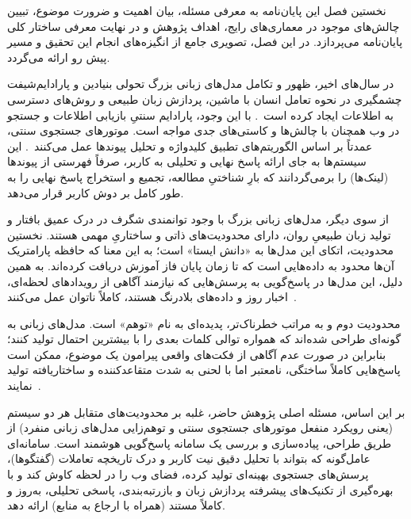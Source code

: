 
نخستین فصل این پایان‌نامه به معرفی مسئله، بیان اهمیت و ضرورت موضوع، تبیین چالش‌های موجود در معماری‌های رایج، اهداف پژوهش و در نهایت معرفی ساختار کلی پایان‌نامه می‌پردازد. در این فصل، تصویری جامع از انگیزه‌های انجام این تحقیق و مسیر پیش رو ارائه می‌گردد.


در سال‌های اخیر، ظهور و تکامل مدل‌های زبانی بزرگ تحولی بنیادین و پارادایم‌شیفت چشمگیری در نحوه تعامل انسان با ماشین، پردازش زبان طبیعی و روش‌های دسترسی به اطلاعات ایجاد کرده است~. با این وجود، پارادایم سنتیِ بازیابی اطلاعات و جستجو در وب همچنان با چالش‌ها و کاستی‌های جدی مواجه است. موتورهای جستجوی سنتی، عمدتاً بر اساس الگوریتم‌های تطبیق کلیدواژه و تحلیل پیوندها عمل می‌کنند~. این سیستم‌ها به جای ارائه پاسخ نهایی و تحلیلی به کاربر، صرفاً فهرستی از پیوندها (لینک‌ها) را برمی‌گردانند که بارِ شناختیِ مطالعه، تجمیع و استخراج پاسخ نهایی را به طور کامل بر دوش کاربر قرار می‌دهد.

از سوی دیگر، مدل‌های زبانی بزرگ با وجود توانمندی شگرف در درک عمیق بافتار و تولید زبان طبیعیِ روان، دارای محدودیت‌های ذاتی و ساختاریِ مهمی هستند. نخستین محدودیت، اتکای این مدل‌ها به «دانش ایستا» است؛ به این معنا که حافظه پارامتریک آن‌ها محدود به داده‌هایی است که تا زمان پایان فاز آموزش دریافت کرده‌اند. به همین دلیل، این مدل‌ها در پاسخ‌گویی به پرسش‌هایی که نیازمند آگاهی از رویدادهای لحظه‌ای، اخبار روز و داده‌های بلادرنگ هستند، کاملاً ناتوان عمل می‌کنند~. 

محدودیت دوم و به مراتب خطرناک‌تر، پدیده‌ای به نام «توهم» است. مدل‌های زبانی به گونه‌ای طراحی شده‌اند که همواره توالی کلمات بعدی را با بیشترین احتمال تولید کنند؛ بنابراین در صورت عدم آگاهی از فکت‌های واقعی پیرامون یک موضوع، ممکن است پاسخ‌هایی کاملاً ساختگی، نامعتبر اما با لحنی به شدت متقاعدکننده و ساختاریافته تولید نمایند~. 

بر این اساس، مسئله اصلی پژوهش حاضر، غلبه بر محدودیت‌های متقابل هر دو سیستم (یعنی رویکرد منفعل موتورهای جستجوی سنتی و توهم‌زایی مدل‌های زبانی منفرد) از طریق طراحی، پیاده‌سازی و بررسی یک سامانه پاسخ‌گویی هوشمند است. سامانه‌ای عامل‌گونه که بتواند با تحلیل دقیق نیت کاربر و درک تاریخچه تعاملات (گفتگوها)، پرسش‌های جستجوی بهینه‌ای تولید کرده، فضای وب را در لحظه کاوش کند و با بهره‌گیری از تکنیک‌های پیشرفته پردازش زبان و بازرتبه‌بندی، پاسخی تحلیلی، به‌روز و کاملاً مستند (همراه با ارجاع به منابع) ارائه دهد.


